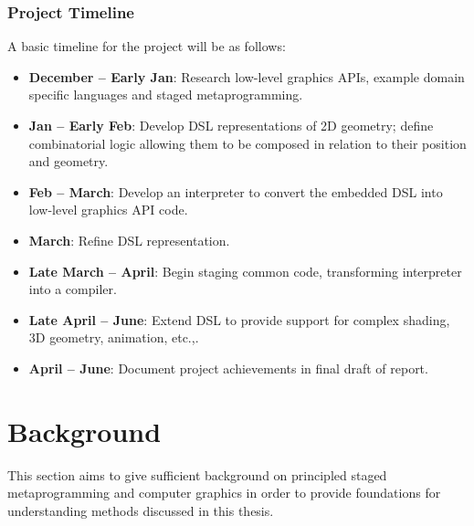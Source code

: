 \documentclass[12pt,twoside]{report}
\begin{document}
\subsection{Project Timeline}

A basic timeline for the project will be as follows:

\begin{itemize}[topsep=0px,parsep=0px]
  \item \textbf{December -- Early Jan}: Research low-level graphics APIs, example domain specific languages and staged metaprogramming.
  \item \textbf{Jan -- Early Feb}: Develop DSL representations of 2D geometry; define combinatorial logic allowing them to be composed in relation to their position and geometry.
  \item \textbf{Feb -- March}: Develop an interpreter to convert the embedded DSL into low-level graphics API code.
  \item \textbf{March}: Refine DSL representation.  
  \item \textbf{Late March -- April}: Begin staging common code, transforming interpreter into a compiler.
  \item \textbf{Late April -- June}: Extend DSL to provide support for complex shading, 3D geometry, animation, etc.,. 
  \item \textbf{April -- June}: Document project achievements in final draft of report.  
\end{itemize}




\chapter{Background}

This section aims to give sufficient background on principled staged metaprogramming and computer graphics in order to provide foundations for understanding methods discussed in this thesis.

\end{document}
